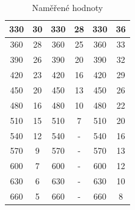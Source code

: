 \documentclass{praktikum}
\begin{document}
\begin{table}[H]
{\begin{tabular}{|cc|cc|cc|}
\multicolumn{1}{|c|}{330} & 30 & \multicolumn{1}{c|}{330} & 28 & \multicolumn{1}{c|}{330} & 36 \\ \hline
\multicolumn{1}{|c|}{360} & 28 & \multicolumn{1}{c|}{360} & 25 & \multicolumn{1}{c|}{360} & 33 \\ \hline
\multicolumn{1}{|c|}{390} & 26 & \multicolumn{1}{c|}{390} & 20 & \multicolumn{1}{c|}{390} & 32 \\ \hline
\multicolumn{1}{|c|}{420} & 23 & \multicolumn{1}{c|}{420} & 16 & \multicolumn{1}{c|}{420} & 29 \\ \hline
\multicolumn{1}{|c|}{450} & 20 & \multicolumn{1}{c|}{450} & 13 & \multicolumn{1}{c|}{450} & 26 \\ \hline
\multicolumn{1}{|c|}{480} & 16 & \multicolumn{1}{c|}{480} & 10 & \multicolumn{1}{c|}{480} & 22 \\ \hline
\multicolumn{1}{|c|}{510} & 15 & \multicolumn{1}{c|}{510} & 7  & \multicolumn{1}{c|}{510} & 20 \\ \hline
\multicolumn{1}{|c|}{540} & 12 & \multicolumn{1}{c|}{540} & -  & \multicolumn{1}{c|}{540} & 16 \\ \hline
\multicolumn{1}{|c|}{570} & 9  & \multicolumn{1}{c|}{570} & -  & \multicolumn{1}{c|}{570} & 13 \\ \hline
\multicolumn{1}{|c|}{600} & 7  & \multicolumn{1}{c|}{600} & -  & \multicolumn{1}{c|}{600} & 12 \\ \hline
\multicolumn{1}{|c|}{630} & 6  & \multicolumn{1}{c|}{630} & -  & \multicolumn{1}{c|}{630} & 10 \\ \hline
\multicolumn{1}{|c|}{660} & 5  & \multicolumn{1}{c|}{660} & -  & \multicolumn{1}{c|}{660} & 8  \\ \hline
\end{tabular}%
}
\caption{Naměřené hodnoty}
\label{tab:namerene_hodnoty}
\end{table}
\begin{table}[H]
\centering
{}
\caption{Parametry měřených prvků}
\label{tab:parametry}
\end{table}
\end{document}
